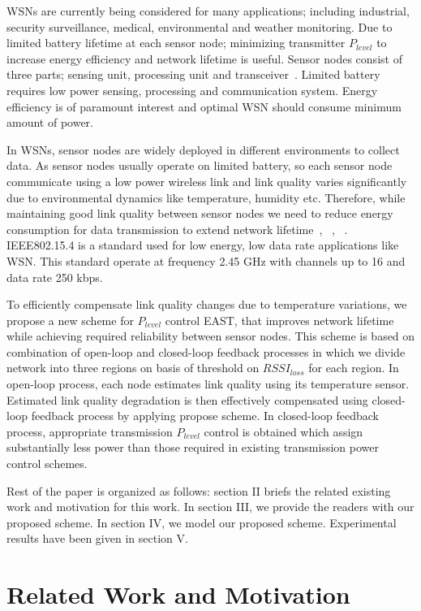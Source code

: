 \documentclass[12pt, conference, compsocconf, onecolumn, draftcls]{IEEEtran}
\begin{document}
WSNs are currently being considered for many applications; including industrial, security surveillance, medical, environmental and weather monitoring. Due to limited battery lifetime at each sensor node; minimizing transmitter $P_{level}$ to increase energy efficiency and network lifetime is useful. Sensor nodes consist of three parts; sensing unit, processing unit and transceiver~\cite{1}. Limited battery requires low power sensing, processing and communication system. Energy efficiency is of paramount interest and optimal WSN  should consume minimum amount of power.

In WSNs, sensor nodes are widely deployed in different environments to collect data. As sensor nodes usually operate on limited battery, so each sensor node communicate using a low power wireless link and link quality varies significantly due to environmental dynamics like temperature, humidity etc. Therefore, while maintaining good link quality between sensor nodes we need to reduce energy consumption for data transmission to extend network lifetime~\cite{2}, ~\cite{3}, ~\cite{4}. IEEE802.15.4 is a standard used for low energy, low data rate applications like WSN. This standard operate at  frequency  2.45 GHz with  channels up to 16 and  data rate  250 kbps.

To efficiently compensate link quality changes due to temperature variations, we propose a new scheme for $P_{level}$ control EAST, that improves network lifetime while achieving required reliability between sensor nodes. This scheme is based on combination of open-loop and closed-loop feedback processes in which we divide network into three regions on basis of threshold on $RSSI_{loss}$ for each region. In open-loop process, each node estimates link quality using its temperature sensor. Estimated link quality degradation is then effectively compensated using closed-loop feedback process by applying propose scheme. In closed-loop feedback process, appropriate transmission $P_{level}$ control is obtained  which assign substantially less power than those required in existing transmission power control schemes.

Rest of the paper is organized as follows: section II briefs the related existing work and motivation for this work. In section III, we provide the readers with our proposed scheme. In section IV, we model our proposed scheme. Experimental results have been given in section V.

\section{Related Work and Motivation}
\end{document}

